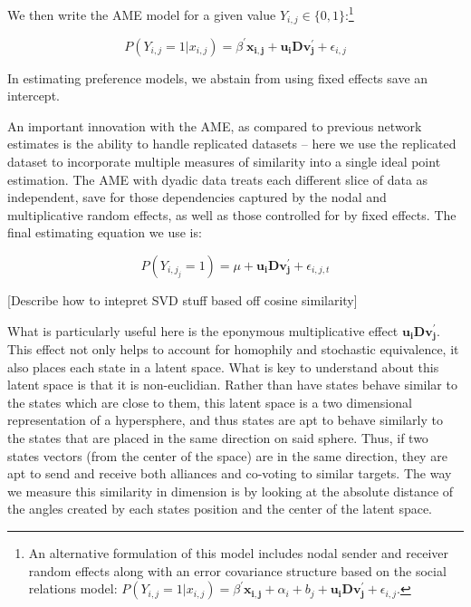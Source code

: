 We then write the AME model for a given value $Y_{i,j} \in \{0,1\}$:\footnote{An alternative formulation of this model includes nodal sender and receiver random effects along with an error covariance structure based on the social relations model: $P(Y_{i,j} = 1| x_{i,j}) = \beta^{'}\mathbf{x_{i,j}} + \alpha_{i} + b_{j} + \mathbf{u_{i}Dv^{'}_{j}} + \epsilon_{i,j}$. }

\begin{equation}
	P(Y_{i,j} = 1| x_{i,j}) = \beta^{'}\mathbf{x_{i,j}} + \mathbf{u_{i}Dv^{'}_{j}} + \epsilon_{i,j}
\end{equation}

In estimating preference models, we abstain from using fixed effects save an intercept.

An important innovation with the AME, as compared to previous network estimates is the ability to handle replicated datasets -- here we use the replicated dataset to incorporate multiple measures of similarity into a single ideal point estimation.  The AME with dyadic data treats each different slice of data as independent, save for those dependencies captured by the nodal and multiplicative random effects, as well as those controlled for by fixed effects. The final estimating equation we use is:

\begin{equation}
	P(Y_{i,j_j} = 1) = \mu + \mathbf{u_{i}Dv^{'}_{j}} + \epsilon_{i,j,t}
\end{equation}

[Describe how to intepret SVD stuff based off cosine similarity]

What is particularly useful here is the eponymous multiplicative effect $\mathbf{u_{i}Dv^{'}_{j}}$. This effect not only helps to account for homophily and stochastic equivalence, it also places each state in a latent space. What is key to understand about this latent space is that it is non-euclidian. Rather than have states behave similar to the states which are close to them, this latent space is a two dimensional representation of a hypersphere, and thus states are apt to behave similarly to the states that are placed in the same direction on said sphere. Thus, if two states vectors (from the center of the space) are in the same direction, they are apt to send and receive both alliances and co-voting to similar targets. The way we measure this similarity in dimension is by looking at the absolute distance of the angles created by each states position and the center of the latent space. 
